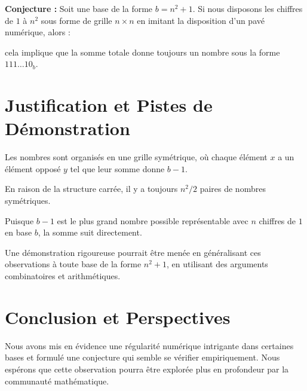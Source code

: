 \documentclass{article}
\begin{document}
\textbf{Conjecture :} Soit une base de la forme $b = n^2 + 1$. Si nous disposons les chiffres de $1$ à $n^2$ sous forme de grille $n \times n$ en imitant la disposition d'un pavé numérique, alors :



cela implique que la somme totale donne toujours un nombre sous la forme $111\ldots10_b$.

\section{Justification et Pistes de Démonstration}

Les nombres sont organisés en une grille symétrique, où chaque élément $x$ a un élément opposé $y$ tel que leur somme donne $b - 1$.

En raison de la structure carrée, il y a toujours $n^2/2$ paires de nombres symétriques.

Puisque $b - 1$ est le plus grand nombre possible représentable avec $n$ chiffres de $1$ en base $b$, la somme suit directement.

Une démonstration rigoureuse pourrait être menée en généralisant ces observations à toute base de la forme $n^2 + 1$, en utilisant des arguments combinatoires et arithmétiques.

\section{Conclusion et Perspectives}

Nous avons mis en évidence une régularité numérique intrigante dans certaines bases et formulé une conjecture qui semble se vérifier empiriquement. Nous espérons que cette observation pourra être explorée plus en profondeur par la communauté mathématique.
\end{document}
